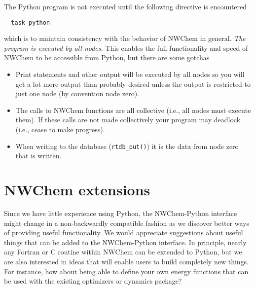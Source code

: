The Python program is not executed until the following directive
is encountered
\begin{verbatim}
  task python
\end{verbatim}
which is to maintain consistency with the behavior of NWChem in general.
{\em The program is executed by all nodes.}  This enables the full functionality and speed of NWChem to be accessible from Python, but there are some gotchas
\begin{itemize}
\item Print statements and other output will be executed by all nodes
so you will get a lot more output than probably desired unless the
output is restricted to just one node (by convention node zero).
\item The calls to NWChem functions are all collective (i.e., all
nodes must execute them).  If these calls are not made collectively
your program may deadlock (i.e., cease to make progress).

\item When writing to the database (\verb+rtdb_put()+) it is the data
from node zero that is written.
\end{itemize}

\section{NWChem extensions}

Since we have little experience using Python, the NWChem-Python
interface might change in a non-backwardly compatible fashion as we
discover better ways of providing useful functionality.  We would
appreciate suggestions about useful things that can be added to the
NWChem-Python interface.  In principle, nearly any Fortran or C
routine within NWChem can be extended to Python, but we are also
interested in ideas that will enable users to build completely new
things.  For instance, how about being able to define your own energy
functions that can be used with the existing optimizers or dynamics
package?

